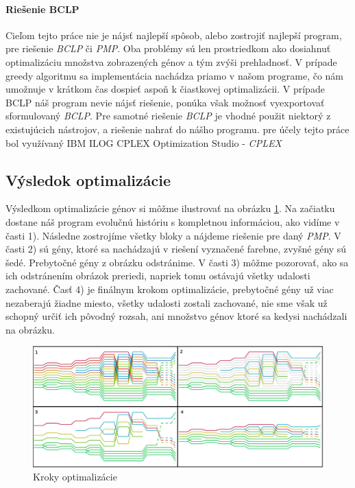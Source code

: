 \paragraph{Riešenie BCLP}
Cieľom tejto práce nie je nájsť najlepší spôsob,
alebo zostrojiť najlepší program, pre riešenie \emph{BCLP} či \emph{PMP}.
Oba problémy sú len prostriedkom ako dosiahnuť optimalizáciu množstva zobrazených génov a tým zvýši prehladnosť.
V prípade greedy algoritmu sa implementácia nachádza priamo v našom programe,
čo nám umožnuje v krátkom čas dospieť aspoň k čiastkovej optimalizácii.
V prípade BCLP náš program nevie nájsť riešenie, ponúka však možnosť vyexportovať sformulovaný \emph{BCLP}.
Pre samotné riešenie \emph{BCLP} je vhodné použit niektorý z existujúcich nástrojov\cite{wiki}, 
a riešenie nahrať do nášho programu. pre účely tejto práce bol využívaný IBM ILOG CPLEX Optimization Studio - \emph{CPLEX}
\subsection{Výsledok optimalizácie}
Výsledkom optimalizácie génov si môžme ilustrovať na obrázku \ref{obr:opt}.
Na začiatku dostane náš program evolučnú históriu s kompletnou informáciou, ako vidíme v časti 1).
Následne zostrojíme všetky bloky a nájdeme riešenie pre daný \emph{PMP}.
V časti 2) sú gény, ktoré sa nachádzajú v riešení vyznačené farebne, zvyšné gény sú šedé.
Prebytočné gény z obrázku odstránime. V časti 3) môžme pozorovať, ako sa ich odstránením obrázok preriedi, 
napriek tomu ostávajú všetky udalosti zachované.
Časť 4) je finálnym krokom optimalizácie, prebytočné gény už viac nezaberajú žiadne miesto, všetky udalosti zostali zachované,
nie sme však už schopný určiť ich pôvodný rozsah, ani množstvo génov ktoré sa kedysi nachádzali na obrázku.
\begin{figure}[t]
 \centering
\includegraphics[width=1.1\textwidth]{images/optimalizacia}
\caption{Kroky optimalizácie}\label{obr:opt}
\end{figure}

